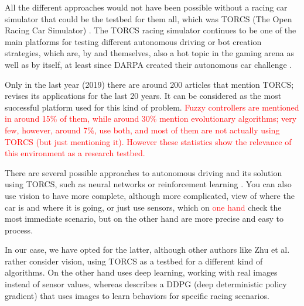\documentclass[10pt,journal,compsoc]{IEEEtran}
\begin{document}

All the different approaches would not have been possible without a
racing car simulator that could be the testbed for them all, which was
TORCS (The Open Racing Car Simulator) \cite{torcs4}. The TORCS racing simulator
continues to be one of the main platforms  
for testing different autonomous driving or bot creation strategies,
which are, by and themselves, also a hot topic in the gaming arena as
well as by itself, at least since DARPA created their autonomous car
challenge \cite{badue2019selfdriving}.


Only in the last year (2019) there are around 200 articles that
mention TORCS; \cite{schiavullo2019torcs} revises its applications for the last 20 years. It can be considered as the most successful platform used for this kind of problem.
\textcolor{red}{ 
Fuzzy controllers are mentioned in around 15\% of them, while around 30\% mention evolutionary algorithms; very few, however, around 7\%, use both, and most of them are not actually using TORCS (but just mentioning it). However these statistics show the relevance of this environment as a research testbed.
}

There are several possible approaches to autonomous driving and its
solution using TORCS, such as neural networks or reinforcement learning \cite{abuzekry2comparative}. 
You can also use vision to have more complete, although more complicated, view of where the car is and where it is going, or just use sensors, which on \textcolor{red}{one hand} check the most immediate scenario, but on the other hand are more precise and easy to process.

In our case, we have opted for the latter, although other authors like Zhu et al.
\cite{zhu2019vision} rather
consider vision, using TORCS as a testbed for a different kind of
algorithms. On the other hand \cite{8833873} uses deep learning, working with real images instead of sensor values, whereas \cite{Kaushik_2018_ECCV_Workshops} describes a DDPG (deep deterministic policy gradient) that uses images to learn behaviors for specific racing scenarios.
\end{document}
